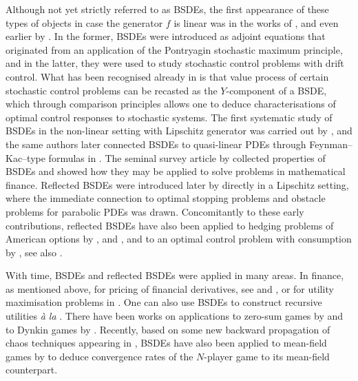 \documentclass[10pt]{article} %
\begin{document}
\medskip
Although not yet strictly referred to as BSDEs, the first appearance of these types of objects in case the generator $f$ is linear was in the works of \citeauthor*{bismut1973analyse} \cite{bismut1973analyse,bismut1973conjugate}, and even earlier by \citeauthor*{davis1973dynamic} \cite{davis1973dynamic}. In the former, BSDEs were introduced as adjoint equations that originated from an application of the Pontryagin stochastic maximum principle, and in the latter, they were used to study stochastic control problems with drift control. What has been recognised already in \cite{davis1973dynamic} is that value process of certain stochastic control problems can be recasted as the $Y$-component of a BSDE, which through comparison principles allows one to deduce characterisations of optimal control responses to stochastic systems. The first systematic study of BSDEs in the non-linear setting with Lipschitz generator was carried out by \citeauthor{pardoux1990adapted} \cite{pardoux1990adapted}, and the same authors later connected BSDEs to quasi-linear PDEs through Feynman--Kac--type formulas in \cite{pardoux1992backward}. The seminal survey article by \citeauthor*{el1997backward} \cite{el1997backward} collected properties of BSDEs and showed how they may be applied to solve problems in mathematical finance. Reflected BSDEs were introduced later by \citeauthor*{el1997reflected} \cite{el1997reflected} directly in a Lipschitz setting, where the immediate connection to optimal stopping problems and obstacle problems for parabolic PDEs was drawn. Concomitantly to these early contributions, reflected BSDEs have also been applied to hedging problems of American options by \citeauthor*{el1997non} \cite{el1997non}, and \citeauthor*{el1997reflected2} \cite{el1997reflected2}, and to an optimal control problem with consumption by \citeauthor*{el1998optimization} \cite{el1998optimization}, see also \citeauthor*{bally2002reflected} \cite{bally2002reflected}.

\medskip
With time, BSDEs and reflected BSDEs were applied in many areas. In finance, as mentioned above, for pricing of financial derivatives, see \citeauthor*{el1997backward} \cite{el1997backward} and \cite{el1997non,el1997reflected2}, or for utility maximisation problems in \citeauthor*{hu2005utility} \cite{hu2005utility}. One can also use BSDEs to construct recursive utilities \emph{\`a la} \citeauthor*{duffie1992asset} \cite{duffie1992asset,duffie1992stochastic}. There have been works on applications to zero-sum games by \citeauthor*{hamadene1995zero} \cite{hamadene1995zero} and to Dynkin games by \citeauthor*{cvitanic1996backward} \cite{cvitanic1996backward}. Recently, based on some new backward propagation of chaos techniques appearing in \citeauthor*{lauriere2019backward} \cite{lauriere2019backward}, BSDEs have also been applied to mean-field games by \citeauthor*{possamai2021non} \cite{possamai2021non} to deduce convergence rates of the $N$-player game to its mean-field counterpart.
\end{document}
